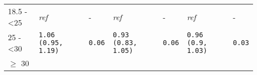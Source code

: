 \documentclass[]{article}
\begin{document}
\begin{longtable}[]{@{}lllllll@{}}
\begin{minipage}[t]{0.10\columnwidth}\raggedright\strut
18.5 - \textless{}25\strut
\end{minipage} & \begin{minipage}[t]{0.19\columnwidth}\raggedright\strut
\emph{ref}\strut
\end{minipage} & \begin{minipage}[t]{0.05\columnwidth}\raggedright\strut
-\strut
\end{minipage} & \begin{minipage}[t]{0.19\columnwidth}\raggedright\strut
\emph{ref}\strut
\end{minipage} & \begin{minipage}[t]{0.05\columnwidth}\raggedright\strut
-\strut
\end{minipage} & \begin{minipage}[t]{0.19\columnwidth}\raggedright\strut
\emph{ref}\strut
\end{minipage} & \begin{minipage}[t]{0.05\columnwidth}\raggedright\strut
-\strut
\end{minipage}\tabularnewline
\begin{minipage}[t]{0.10\columnwidth}\raggedright\strut
25 - \textless{}30\strut
\end{minipage} & \begin{minipage}[t]{0.19\columnwidth}\raggedright\strut
\tt{1.06} (\tt{0.95}, \tt{1.19})\strut
\end{minipage} & \begin{minipage}[t]{0.05\columnwidth}\raggedright\strut
\tt{0.06}\strut
\end{minipage} & \begin{minipage}[t]{0.19\columnwidth}\raggedright\strut
\tt{0.93} (\tt{0.83}, \tt{1.05})\strut
\end{minipage} & \begin{minipage}[t]{0.05\columnwidth}\raggedright\strut
\tt{0.06}\strut
\end{minipage} & \begin{minipage}[t]{0.19\columnwidth}\raggedright\strut
\tt{0.96} (\tt{0.9}, \tt{1.03})\strut
\end{minipage} & \begin{minipage}[t]{0.05\columnwidth}\raggedright\strut
\tt{0.03}\strut
\end{minipage}\tabularnewline
\begin{minipage}[t]{0.10\columnwidth}\raggedright\strut
\(\ge\) 30\strut
\end{minipage} & \begin{minipage}[t]{0.19\columnwidth}\raggedright\strut

\end{minipage}
\end{longtable}
\end{document}

